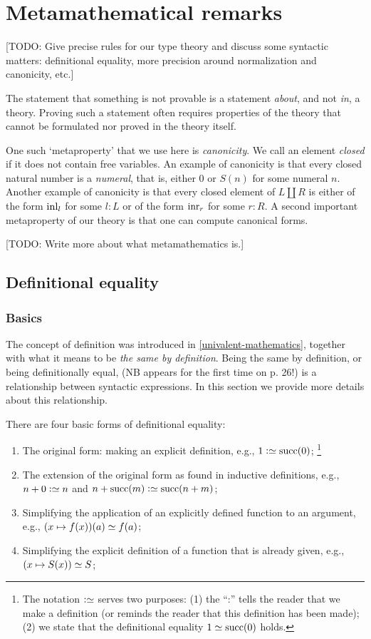 \chapter{Metamathematical remarks}
\label{app:metamath}

[TODO: Give precise rules for our type theory and discuss some syntactic matters:
definitional equality, more precision around normalization and canonicity, etc.]

The statement that something is not provable is a statement \emph{about},
and not \emph{in}, a theory. Proving such a statement often requires
properties of the theory that cannot be formulated nor proved in the theory itself.

One such `metaproperty' that we use here is \emph{canonicity}.
We call an element \emph{closed} if it does not contain free variables.
An example of canonicity is that every closed natural number is a \emph{numeral},
that is, either $0$ or $S(n)$ for some numeral $n$.
Another example of canonicity is that every closed element of $L\coprod R$
is either of the form $\inl{l}$ for some $l:L$ or
of the form $\inr{r}$ for some $r:R$.
A second important metaproperty of our theory is that one can compute canonical forms.

[TODO: Write more about what metamathematics is.]

\section{Definitional equality}
\label{sec:defeq}

\subsection{Basics}
\label{sec:defeq-basics}

The concept of definition was introduced in \cref{univalent-mathematics},
together with what it means to be \emph{the same by definition}. 
Being the same by definition, or being definitionally equal, 
(NB appears for the first time on p. 26!) 
is a relationship between syntactic expressions.
In this section we provide more details about this relationship.

There are four basic forms of definitional equality:
\begin{enumerate}
\item The original form: making an explicit definition, e.g., $1 \defeq \Succ(0)$;%
\footnote{The notation $\defeq$ serves two purposes: 
(1) the ``:'' tells the reader that we make a definition
(or reminds the reader that this definition has been made);
(2) we state that the definitional equality $1 \jdeq \Succ(0)$ holds.}
\item The extension of the original form as found in inductive definitions,
e.g., $n+0 \defeq n$ and $n+\Succ(m) \defeq \Succ(n+m)$;
\item Simplifying the application of an explicitly defined function to an argument,
e.g., $(x \mapsto f(x))(a) \jdeq f(a)$;
\item Simplifying the explicit definition of a function that is already given,
e.g., $(x \mapsto S(x)) \jdeq S$;
\end{enumerate}


